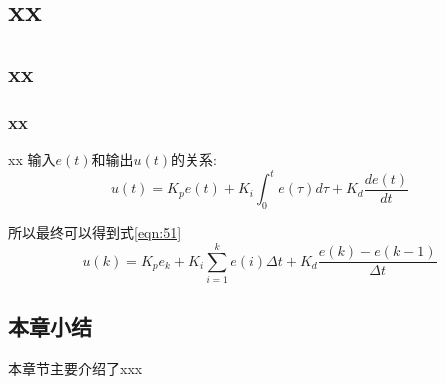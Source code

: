\chapter{xx}

\section{xx}
\subsection{xx}
xx
输入$e(t)$和输出$u(t)$的关系:
\begin{equation}
    u(t)=K_{p} e(t)+K_{i} \int_{0}^{t} e(\tau) d \tau+K_{d} \frac{d e(t)}{d t}
\end{equation}

所以最终可以得到式\eqref{eqn:51}
\begin{equation}
    \label{eqn:51}
    u(k)=K_{p} e_{k}+K_{i} \sum_{i=1}^{k} e(i) \Delta t+K_{d} \frac{e(k)-e(k-1)}{\Delta t}
\end{equation}


\section{本章小结}
本章节主要介绍了xxx 
